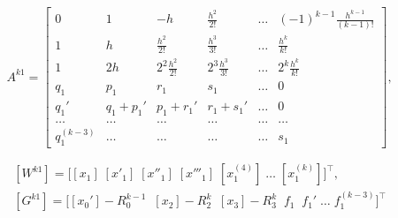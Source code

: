 \begin{equation}

\label{mc:eq28}

    A^{k1}=

\begin{bmatrix}

     0 & 1 &   -h &   \frac{h^{2}}{2!} &     \dots  &     (-1)^{k-1}\frac{h^{k-1}}{(k-1)!}

   \\

      1 &   h &   \frac{h^{2}}{2!} &   \frac{h^{3}}{3!} & \dots  &     \frac{h^{k}}{k!}

   \\

     1 &     2h &   2^2\frac{h^{2}}{2!} &     2^3\frac{h^{3}}{3!} & \dots  &     2^k\frac{h^{k}}{k!}

   \\

      q_1 &     p_1 &     r_1 &     s_1 & \dots  &    0

   \\

       q_1' &     q_1+p_1' &     p_1+r_1' &   r_1+s_1' & \dots  &     0

   \\

   \dots   & \dots   & \dots   & \dots   & \dots & \dots

   \\

      q_1^{(k-3)} & \dots & \dots & \dots  & \dots &     s_1

 \end{bmatrix}

 ,

\end{equation}



\begin{gather}

\label{mc:eq29}

   [W^{k1}]=\bigl[[x_1]\;[x'_1]\;[x''_1]\;[x'''_1]\;[x_1^{(4)}]\;\dots\;[x_1^{(k)}]\bigr]^\top,

\\

\label{mc:eq30}

   [G^{k1}]=\bigl[[x_{0}']{-}R_{0}^{k-1}\;\;[x_{2}]{-}R_{2}^k\;\;[x_{3}]{-}R_{3}^k\;\;f_1\;\;f_1'\;\dots\;f_{1}^{(k-3)}\bigr]^\top

\end{gather}

